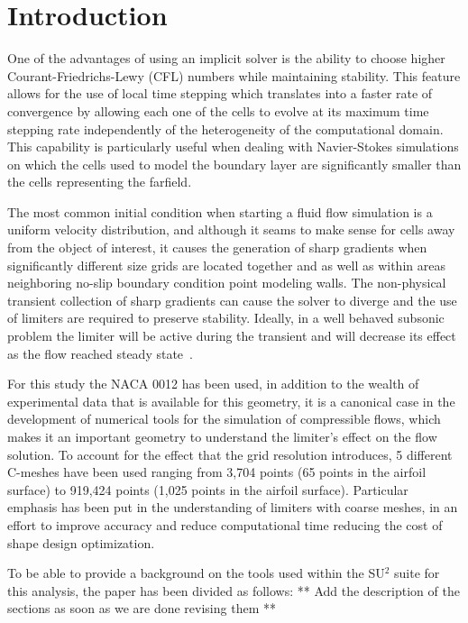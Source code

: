 
\section{Introduction}
One of the advantages of using an implicit solver is the ability to choose higher Courant-Friedrichs-Lewy (CFL) numbers while maintaining stability. This feature allows for the use of local time stepping which translates into a faster rate of convergence by allowing each one of the cells to evolve at its maximum time stepping rate independently of the heterogeneity of the computational domain. This capability is particularly useful when dealing with Navier-Stokes simulations on which the cells used to model the boundary layer are significantly smaller than the cells representing the farfield. 

The most common initial condition when starting a fluid flow simulation is a uniform velocity distribution, and although it seams to make sense for cells away from the object of interest, it causes the generation of sharp gradients when significantly different size grids are located together and as well as within areas neighboring no-slip boundary condition point modeling walls. The non-physical transient collection of sharp gradients can cause the solver to diverge and the use of limiters are required to preserve stability. Ideally, in a well behaved subsonic problem the limiter will be active during the transient and will decrease its effect as the flow reached steady state~\cite{Venkatakrishnan:1993}.

For this study the NACA 0012 has been used, in addition to the wealth of experimental data that is available for this geometry, it is a canonical case in the development of numerical tools for the simulation of compressible flows, which makes it an important geometry to understand the limiter's effect on the flow solution. To account for the effect that the grid resolution introduces, 5 different C-meshes have been used ranging from 3,704 points (65 points in the airfoil surface) to 919,424 points (1,025 points in the airfoil surface). Particular emphasis has been put in the understanding of limiters with coarse meshes, in an effort to improve accuracy and reduce computational time reducing the cost of shape design optimization.

To be able to provide a background on the tools used within the SU$^2$ suite for this analysis, the paper has been divided as follows: ** Add the description of the sections as soon as we are done revising them **